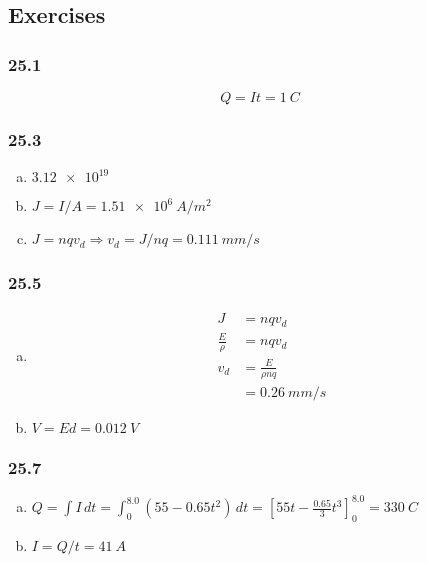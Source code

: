 \documentclass{article}
\begin{document}
\subsection{Exercises}

\subsubsection{25.1}

\[Q = I t = \qty{1}{C}\]

\subsubsection{25.3}

\begin{enumerate}[(a)]
  \item $\num{3.12e19}$

  \item $J = I / A = \qty{1.51e6}{A/m^2}$

  \item $J = n q v_d \Rightarrow v_d = J / n q = \qty{0.111}{mm/s}$
\end{enumerate}

\subsubsection{25.5}

\begin{enumerate}[(a)]
  \item

        \begin{align*}
          J              & = n q v_d            \\
          \frac{E}{\rho} & = n q v_d            \\
          v_d            & = \frac{E}{\rho n q} \\
                         & = \qty{0.26}{mm/s}
        \end{align*}

  \item $V = E d = \qty{0.012}{V}$
\end{enumerate}

\subsubsection{25.7}

\begin{enumerate}[(a)]
  \item $Q = \int I \,dt = \int_0^{8.0} (55 - 0.65 t^2) \,dt = [55t - \frac{0.65}{3} t^3]_0^{8.0} = \qty{330}{C}$

  \item $I = Q / t = \qty{41}{A}$
\end{enumerate}
\end{document}
